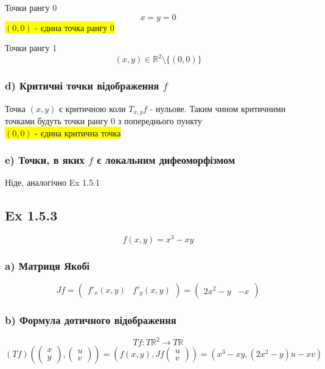 \documentclass[10pt, a4paper]{article} %
\newcommand{\R}{\mathbb{R}}
\newcommand{\J}{J}
\begin{document}
Точки рангу 0
\[x=y=0\]
\colorbox{yellow}{$(0,0)$ - єдина точка рангу 0}

Точки рангу 1
\[(x,y) \in \R^2 \setminus \{(0,0)\}\]

\subsubsection*{d) Критичні точки відображення $f$}
Точка $(x,y)$ є критичною коли $T_{x,y}f$ - нульове.
Таким чином критичними точками будуть точки рангу 0 з попереднього пункту\\
\colorbox{yellow}{$(0,0)$ - єдина критична точка}

\subsubsection*{e) Точки, в яких $f$ є локальним дифеоморфізмом}
Ніде, аналогічно Ex 1.5.1


\subsection*{Ex 1.5.3}
\begin{mdframed}
    \[f(x,y) = x^3 - xy\]
\end{mdframed}

\subsubsection*{a) Матриця Якобі}
\[\J f = \begin{pmatrix}
    f'_x(x,y) & f'_y(x,y)
\end{pmatrix} = \begin{pmatrix}
    2x^2-y & -x
\end{pmatrix}\]

\subsubsection*{b) Формула дотичного відображення}
\[Tf : T\R^2 \to T\R\]
\[(Tf)\left(\begin{pmatrix} x \\ y \end{pmatrix}, \begin{pmatrix} u \\ v \end{pmatrix}\right) 
= \left(f(x,y),\J f \begin{pmatrix} u \\ v \end{pmatrix}\right) 
= \left(x^3 - xy, (2x^2-y)u - xv\right)\]
\end{document}
